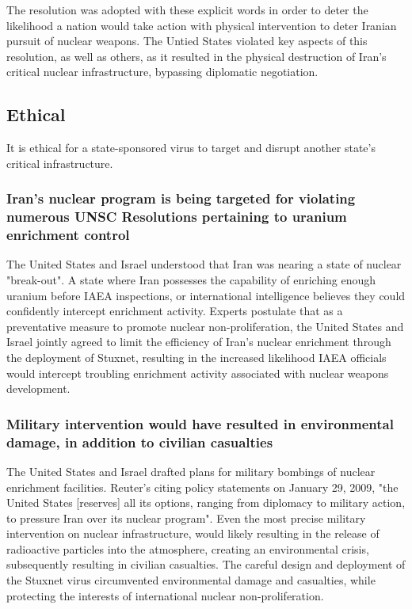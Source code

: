 \documentclass[12pt]{article}
\begin{document}
\begin{multicols}{2}
The resolution was adopted with these explicit words in order to deter the likelihood a nation would take action with physical intervention to deter Iranian pursuit of nuclear weapons. The Untied States violated key aspects of this resolution, as well as others, as it resulted in the physical destruction of Iran's critical nuclear infrastructure, bypassing diplomatic negotiation.

\subsection{Ethical}

It is ethical for a state-sponsored virus to target and disrupt another state's critical infrastructure.

\subsubsection{Iran's nuclear program is being targeted for violating numerous UNSC Resolutions pertaining to uranium enrichment control}

The United States and Israel understood that Iran was nearing a state of nuclear "break-out". A state where Iran possesses the capability of enriching enough uranium before IAEA inspections, or international intelligence believes they could confidently intercept enrichment activity. Experts postulate that as a preventative measure to promote nuclear non-proliferation, the United States and Israel jointly agreed to limit the efficiency of Iran's nuclear enrichment through the deployment of Stuxnet, resulting in the increased likelihood IAEA officials would intercept troubling enrichment activity associated with nuclear weapons development.\cite{theRealStoryOfStuxnet}

\subsubsection{Military intervention would have resulted in environmental damage, in addition to civilian casualties}

The United States and Israel drafted plans for military bombings of nuclear enrichment facilities. Reuter's citing policy statements on January 29, 2009, "the United States [reserves] all its options, ranging from diplomacy to military action, to pressure Iran over its nuclear program".\cite{usOptionsForIran} Even the most precise military intervention on nuclear infrastructure, would likely resulting in the release of radioactive particles into the atmosphere, creating an environmental crisis, subsequently resulting in civilian casualties. The careful design and deployment of the Stuxnet virus circumvented environmental damage and casualties, while protecting the interests of international nuclear non-proliferation.



\end{multicols}
\end{document}

